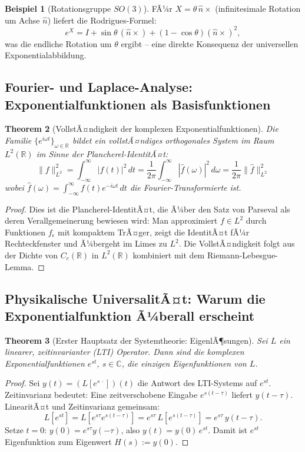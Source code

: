﻿\documentclass[12pt,a4paper]{article}
\newtheorem{theorem}{Theorem}[section]
\theoremstyle{definition}
\newtheorem{example}[theorem]{Beispiel}
\theoremstyle{remark}
\begin{document}
\begin{example}[Rotationsgruppe $SO(3)$]
FÃ¼r $X = \theta\,\hat{n}\times$ (infinitesimale Rotation um Achse $\hat{n}$) liefert die Rodrigues-Formel:
\[
e^X = I + \sin\theta\,(\hat{n}\times) + (1-\cos\theta)(\hat{n}\times)^2,
\]
was die endliche Rotation um $\theta$ ergibt -- eine direkte Konsequenz der universellen Exponentialabbildung.
\end{example}

\subsection{Fourier- und Laplace-Analyse: Exponentialfunktionen als Basisfunktionen}

\begin{theorem}[VollstÃ¤ndigkeit der komplexen Exponentialfunktionen]
\label{thm:fourier_vollstaendig}
Die Familie $\{e^{i\omega t}\}_{\omega \in \mathbb{R}}$ bildet ein vollstÃ¤ndiges orthogonales System im Raum $L^2(\mathbb{R})$ im Sinne der Plancherel-IdentitÃ¤t:
\begin{equation}
\|f\|_{L^2}^2 = \int_{-\infty}^\infty |f(t)|^2\,dt = \frac{1}{2\pi}\int_{-\infty}^\infty |\hat{f}(\omega)|^2\,d\omega = \frac{1}{2\pi}\|\hat{f}\|_{L^2}^2
\end{equation}
wobei $\hat{f}(\omega) = \int_{-\infty}^\infty f(t)e^{-i\omega t}\,dt$ die Fourier-Transformierte ist.
\end{theorem}
\begin{proof}
Dies ist die Plancherel-IdentitÃ¤t, die Ã¼ber den Satz von Parseval als deren Verallgemeinerung bewiesen wird: Man approximiert $f \in L^2$ durch Funktionen $f_\epsilon$ mit kompaktem TrÃ¤ger, zeigt die IdentitÃ¤t fÃ¼r Rechteckfenster und Ã¼bergeht im Limes zu $L^2$. Die VollstÃ¤ndigkeit folgt aus der Dichte von $C_c(\mathbb{R})$ in $L^2(\mathbb{R})$ kombiniert mit dem Riemann-Lebesgue-Lemma. 
\end{proof}

\subsection{Physikalische UniversalitÃ¤t: Warum die Exponentialfunktion Ã¼berall erscheint}

\begin{theorem}[Erster Hauptsatz der Systemtheorie: EigenlÃ¶sungen]
\label{thm:eigenloesung}
Sei $L$ ein linearer, zeitinvarianter (LTI) Operator. Dann sind die komplexen Exponentialfunktionen $e^{st}$, $s \in \mathbb{C}$, die \emph{einzigen} Eigenfunktionen von $L$.
\end{theorem}
\begin{proof}
Sei $y(t) = (L[e^{s\,\cdot}])(t)$ die Antwort des LTI-Systems auf $e^{st}$. Zeitinvarianz bedeutet: Eine zeitverschobene Eingabe $e^{s(t-\tau)}$ liefert $y(t-\tau)$. LinearitÃ¤t und Zeitinvarianz gemeinsam:
\[
L[e^{st}] = L[e^{s\tau} e^{s(t-\tau)}] = e^{s\tau}\,L[e^{s(t-\tau)}] = e^{s\tau}\,y(t-\tau).
\]
Setze $t=0$: $y(0) = e^{s\tau}y(-\tau)$, also $y(t) = y(0)\,e^{st}$. Damit ist $e^{st}$ Eigenfunktion zum Eigenwert $H(s) := y(0)$. 
\end{proof}
\end{document}
